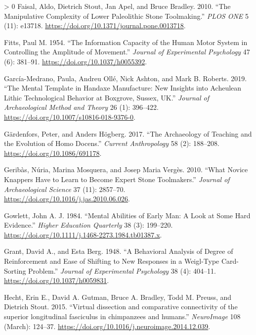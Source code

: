 \documentclass[smallextended]{svjour3}       %
\newlength{\cslhangindent}
\newenvironment{CSLReferences}[3] %
 {%
  \setlength{\parindent}{0pt}
  \ifodd #1 \everypar{\setlength{\hangindent}{\cslhangindent}}\ignorespaces\fi
  \ifnum #2 > 0
  \setlength{\parskip}{#3\baselineskip}
  \fi
 }%
 {}
\begin{document}
\begin{CSLReferences}{1}{0}
\leavevmode\hypertarget{ref-faisal2010}{}%
Faisal, Aldo, Dietrich Stout, Jan Apel, and Bruce Bradley. 2010. {``The
Manipulative Complexity of Lower Paleolithic Stone Toolmaking.''}
\emph{PLOS ONE} 5 (11): e13718.
\url{https://doi.org/10.1371/journal.pone.0013718}.

\leavevmode\hypertarget{ref-fitts1954}{}%
Fitts, Paul M. 1954. {``The Information Capacity of the Human Motor
System in Controlling the Amplitude of Movement.''} \emph{Journal of
Experimental Psychology} 47 (6): 381--91.
\url{https://doi.org/10.1037/h0055392}.

\leavevmode\hypertarget{ref-garcuxeda-medrano2019}{}%
García-Medrano, Paula, Andreu Ollé, Nick Ashton, and Mark B. Roberts.
2019. {``The Mental Template in Handaxe Manufacture: New Insights into
Acheulean Lithic Technological Behavior at Boxgrove, Sussex, UK.''}
\emph{Journal of Archaeological Method and Theory} 26 (1): 396--422.
\url{https://doi.org/10.1007/s10816-018-9376-0}.

\leavevmode\hypertarget{ref-guxe4rdenfors2017}{}%
Gärdenfors, Peter, and Anders Högberg. 2017. {``The Archaeology of
Teaching and the Evolution of Homo Docens.''} \emph{Current
Anthropology} 58 (2): 188--208. \url{https://doi.org/10.1086/691178}.

\leavevmode\hypertarget{ref-geribuxe0s2010}{}%
Geribàs, Núria, Marina Mosquera, and Josep Maria Vergès. 2010. {``What
Novice Knappers Have to Learn to Become Expert Stone Toolmakers.''}
\emph{Journal of Archaeological Science} 37 (11): 2857--70.
\url{https://doi.org/10.1016/j.jas.2010.06.026}.

\leavevmode\hypertarget{ref-gowlett1984}{}%
Gowlett, John A. J. 1984. {``Mental Abilities of Early Man: A Look at
Some Hard Evidence.''} \emph{Higher Education Quarterly} 38 (3):
199--220. \url{https://doi.org/10.1111/j.1468-2273.1984.tb01387.x}.

\leavevmode\hypertarget{ref-grant1948}{}%
Grant, David A., and Esta Berg. 1948. {``A Behavioral Analysis of Degree
of Reinforcement and Ease of Shifting to New Responses in a Weigl-Type
Card-Sorting Problem.''} \emph{Journal of Experimental Psychology} 38
(4): 404--11. \url{https://doi.org/10.1037/h0059831}.

\leavevmode\hypertarget{ref-hecht2015b}{}%
Hecht, Erin E., David A. Gutman, Bruce A. Bradley, Todd M. Preuss, and
Dietrich Stout. 2015. {``Virtual dissection and comparative connectivity
of the superior longitudinal fasciculus in chimpanzees and humans.''}
\emph{NeuroImage} 108 (March): 124--37.
\url{https://doi.org/10.1016/j.neuroimage.2014.12.039}.


\end{CSLReferences}
\end{document}
